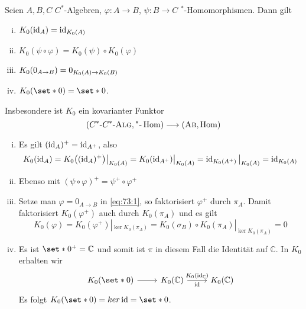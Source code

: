 \begin{proposition}[label=prop:73]
	Seien $A,B,C$ $C^*$-Algebren, $\varphi \colon A \to B$, $\psi \colon B \to C$ $^*$-Homomorphismen.
	Dann gilt
	\begin{enumerate}[(i)]
		\item $K_0(\id_A) = \id_{K_0(A)}$
		\item $K_0(\psi \circ \varphi) = K_0(\psi) \circ K_0(\varphi)$
		\item $K_0 \enbrace*{0_{A \to B}} = 0_{K_0(A) \to K_0(B)}$
		\item $K_0(\set*{0}) = \set*{0}$.
	\end{enumerate}
	Insbesondere ist $K_0$ ein kovarianter Funktor 
	\[
		\enbrace*{C^*\text{-}\CSTAR, {^*\text{-}\Hom}} \longrightarrow \enbrace*{\AB, \Hom}
	\]
\end{proposition}
\begin{beweis}
	\begin{enumerate}[(i)]
		\item Es gilt $(\id_A)^+ = \id_{A^+}$, also
		\[
			K_0(\id_A) = K_0 \enbrace*{(\id_A)^+} \big|_{K_0(A)} = K_0(\id_{A^+})\big|_{K_0(A)} = \id_{K_0(A^+)} \big|_{K_0(A)}  =\id_{K_0(A)}
		\]
		\item Ebenso mit $(\psi \circ \varphi)^+ = \psi^+ \circ \varphi^+$
		\item Setze man $\varphi=0_{A\to B}$ in \eqref{eq:73:1}, so faktorisiert $\varphi^+$ durch $\pi_A$.
		Damit faktorisiert $K_0(\varphi^+)$ auch durch $K_0(\pi_A)$ und es gilt 
		\[
			K_0(\varphi) = K_0(\varphi^+)|_{\ker K_0(\pi_A)} = K_0(\sigma_B) \circ K_0(\pi_A)|_{\ker K_0(\pi_A)} = 0
		\]
		\item Es ist $\set*{0}^+ = \mathbb{C}$ und somit ist $\pi$ in diesem Fall die Identität auf $\mathbb{C}$.
		In $K_0$ erhalten wir
		\[
			\begin{tikzcd}
				K_0(\set*{0}) \rar & K_0(\mathbb{C}) \rar["K_0(\id_\mathbb{C})","\id"'] & K_0(\mathbb{C})
			\end{tikzcd}
		\]
		Es folgt $K_0(\set*{0}) = ker \id = \set*{0}$.\qedhere
	\end{enumerate}
\end{beweis}

